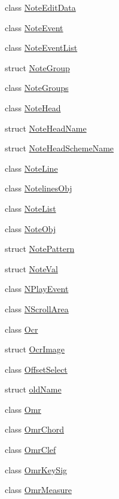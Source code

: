 \begin{DoxyCompactItemize}
\item 
class \hyperlink{class_ms_1_1_note_edit_data}{Note\+Edit\+Data}
\item 
class \hyperlink{class_ms_1_1_note_event}{Note\+Event}
\item 
class \hyperlink{class_ms_1_1_note_event_list}{Note\+Event\+List}
\item 
struct \hyperlink{struct_ms_1_1_note_group}{Note\+Group}
\item 
class \hyperlink{class_ms_1_1_note_groups}{Note\+Groups}
\item 
class \hyperlink{class_ms_1_1_note_head}{Note\+Head}
\item 
struct \hyperlink{struct_ms_1_1_note_head_name}{Note\+Head\+Name}
\item 
struct \hyperlink{struct_ms_1_1_note_head_scheme_name}{Note\+Head\+Scheme\+Name}
\item 
class \hyperlink{class_ms_1_1_note_line}{Note\+Line}
\item 
class \hyperlink{class_ms_1_1_notelines_obj}{Notelines\+Obj}
\item 
class \hyperlink{class_ms_1_1_note_list}{Note\+List}
\item 
class \hyperlink{class_ms_1_1_note_obj}{Note\+Obj}
\item 
struct \hyperlink{struct_ms_1_1_note_pattern}{Note\+Pattern}
\item 
struct \hyperlink{struct_ms_1_1_note_val}{Note\+Val}
\item 
class \hyperlink{class_ms_1_1_n_play_event}{N\+Play\+Event}
\item 
class \hyperlink{class_ms_1_1_n_scroll_area}{N\+Scroll\+Area}
\item 
class \hyperlink{class_ms_1_1_ocr}{Ocr}
\item 
struct \hyperlink{struct_ms_1_1_ocr_image}{Ocr\+Image}
\item 
class \hyperlink{class_ms_1_1_offset_select}{Offset\+Select}
\item 
struct \hyperlink{struct_ms_1_1old_name}{old\+Name}
\item 
class \hyperlink{class_ms_1_1_omr}{Omr}
\item 
class \hyperlink{class_ms_1_1_omr_chord}{Omr\+Chord}
\item 
class \hyperlink{class_ms_1_1_omr_clef}{Omr\+Clef}
\item 
class \hyperlink{class_ms_1_1_omr_key_sig}{Omr\+Key\+Sig}
\item 
class \hyperlink{class_ms_1_1_omr_measure}{Omr\+Measure}
\item 

\end{DoxyCompactItemize}
